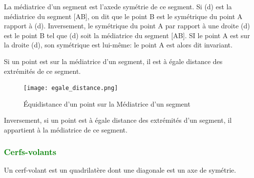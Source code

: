 \documentclass{article}
\begin{document}
\begin{tcolorbox}[colback=red!10!white, colframe=red!75!black, title=\textcolor{white}{Propriété }, sharp corners=south]
    La médiatrice d'un segment est l'axede symétrie de ce segment. Si (d) est la médiatrice du segment [AB], on dit que le point B est le symétrique du point A rapport à (d).
    Inversement, le symétrique du point A par rapport à une droite (d) est le point B tel que (d) soit la médiatrice du segment [AB]. SI le point A est sur la droite (d), son symétrique est lui-même: le point A est alors dit invariant. 
\end{tcolorbox}

\begin{tcolorbox}[colback=red!10!white, colframe=red!75!black, title=\textcolor{white}{Propriété}, sharp corners=south]
   Si un point est sur la médiatrice d'un segment, il est à égale distance des extrémités de ce segment.
\end{tcolorbox}

\begin{figure}[H]
    \centering
    \texttt{[image: egale\_distance.png]}
    \caption{Équidistance d'un point sur la Médiatrice d'un segment}
    \label{fig:enter-label}
\end{figure}

\begin{tcolorbox}[colback=red!10!white, colframe=red!75!black, title=\textcolor{white}{Propriété}, sharp corners=south]

Inversement, si un point est à égale distance des extrémités d'un segment, il appartient à la médiatrice de ce segment.
\end{tcolorbox}

\vspace{0.35cm}

\subsubsection{\textcolor{green}{Cerfs-volants}}

\vspace{0.2cm}

\begin{tcolorbox}[colback=red!10!white, colframe=red!75!black, title=\textcolor{white}{Définition : Cerf-volant}, sharp corners=south]
    Un cerf-volant est un quadrilatère dont une diagonale est un axe de symétrie.
\end{tcolorbox}

\vspace{0.2cm}
\end{document}
